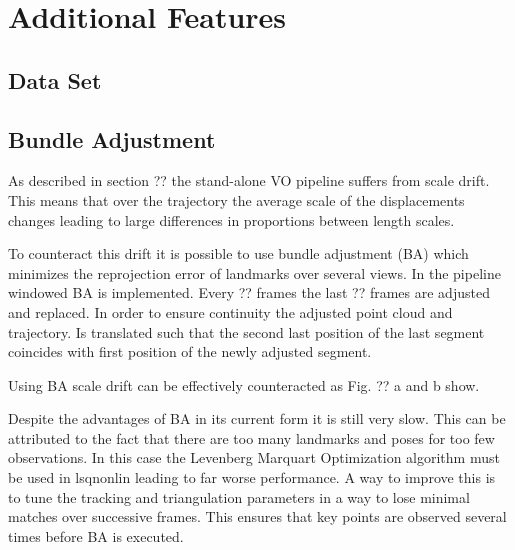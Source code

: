 \chapter{Additional Features}
\section{Data Set}
\label{dataset}

\section{Bundle Adjustment}
\label{bundle adjustment}
As described in section ?? the stand-alone VO pipeline suffers from scale drift. This means that over the trajectory the average scale of the displacements changes leading to large differences in proportions between length scales. \par
To counteract this drift it is possible to use bundle adjustment (BA) which minimizes the reprojection error of landmarks over several views. In the pipeline windowed BA is implemented. Every ?? frames the last ?? frames are adjusted and replaced. In order to ensure continuity the adjusted point cloud and trajectory. Is translated such that the second last position of the last segment coincides with first position of the newly adjusted segment. \par
Using BA scale drift can be effectively counteracted as Fig. ?? a and b show. \par
Despite the advantages of BA in its current form it is still very slow. This can be attributed to the fact that there are too many landmarks and poses for too few observations. In this case the Levenberg Marquart Optimization algorithm must be used in lsqnonlin leading to far worse performance. A way to improve this is to tune the tracking and triangulation parameters in a way to lose minimal matches over successive frames. This ensures that key points are observed several times before BA is executed. 

